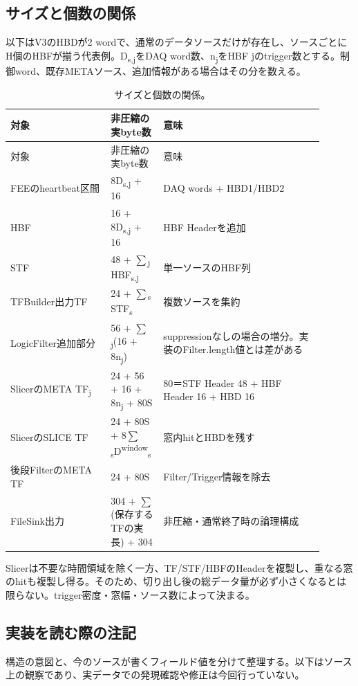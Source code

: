 \FloatBarrier
\subsection{サイズと個数の関係}
\label{sec:format-html-sizes}
以下はV3のHBDが2 wordで、通常のデータソースだけが存在し、ソースごとにH個のHBFが揃う代表例。D\textsubscript{s,j}をDAQ word数、n\textsubscript{j}をHBF jのtrigger数とする。制御word、既存METAソース、追加情報がある場合はその分を数える。


\FloatBarrier
{\footnotesize\setlength{\tabcolsep}{3pt}\begin{longtable}{p{0.3\linewidth}p{0.12\linewidth}p{0.48\linewidth}}
\caption{サイズと個数の関係。}\label{tab:format-html-15}\\
\hline
対象 & 非圧縮の実byte数 & 意味 \\ \hline\endfirsthead
\hline 対象 & 非圧縮の実byte数 & 意味 \\ \hline\endhead
{FEEのheartbeat区間} & {8D\textsubscript{s,j} + 16} & {DAQ words + HBD1/HBD2} \\
{HBF} & {16 + 8D\textsubscript{s,j} + 16} & {HBF Headerを追加} \\
{STF} & {48 + $\sum$\textsubscript{j} HBF\textsubscript{s,j}} & {単一ソースのHBF列} \\
{TFBuilder出力TF} & {24 + $\sum$\textsubscript{s} STF\textsubscript{s}} & {複数ソースを集約} \\
{LogicFilter追加部分} & {56 + $\sum$\textsubscript{j}(16 + 8n\textsubscript{j})} & {suppressionなしの場合の増分。実装のFilter.length値とは差がある} \\
{SlicerのMETA TF\textsubscript{j}} & {24 + 56 + 16 + 8n\textsubscript{j} + 80S} & {80＝STF Header 48 + HBF Header 16 + HBD 16} \\
{SlicerのSLICE TF} & {24 + 80S + 8$\sum$\textsubscript{s}D\textsuperscript{window}\textsubscript{s}} & {窓内hitとHBDを残す} \\
{後段FilterのMETA TF} & {24 + 80S} & {Filter/Trigger情報を除去} \\
{FileSink出力} & {304 + $\sum$(保存するTFの実長) + 304} & {非圧縮・通常終了時の論理構成} \\
\hline\end{longtable}}
Slicerは不要な時間領域を除く一方、TF/STF/HBFのHeaderを複製し、重なる窓のhitも複製し得る。そのため、切り出し後の総データ量が必ず小さくなるとは限らない。trigger密度・窓幅・ソース数によって決まる。


\FloatBarrier
\subsection{実装を読む際の注記}
\label{sec:format-html-implementation}
構造の意図と、今のソースが書くフィールド値を分けて整理する。以下はソース上の観察であり、実データでの発現確認や修正は今回行っていない。


